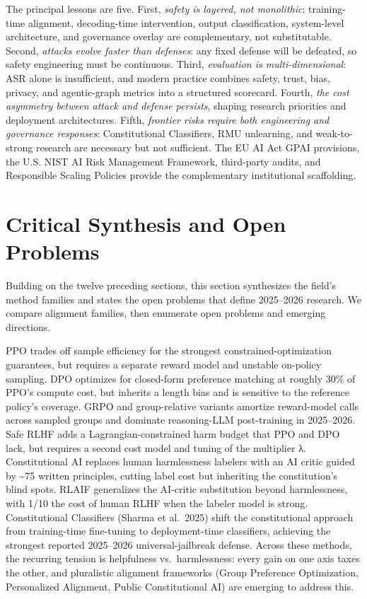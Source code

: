 \documentclass{article}
\begin{document}
The principal lessons are five. First, \emph{safety is layered, not monolithic}: training-time alignment, decoding-time intervention, output classification, system-level architecture, and governance overlay are complementary, not substitutable. Second, \emph{attacks evolve faster than defenses}: any fixed defense will be defeated, so safety engineering must be continuous. Third, \emph{evaluation is multi-dimensional}: ASR alone is insufficient, and modern practice combines safety, trust, bias, privacy, and agentic-graph metrics into a structured scorecard. Fourth, \emph{the cost asymmetry between attack and defense persists}, shaping research priorities and deployment architectures. Fifth, \emph{frontier risks require both engineering and governance responses}: Constitutional Classifiers, RMU unlearning, and weak-to-strong research are necessary but not sufficient. The EU AI Act GPAI provisions, the U.S. NIST AI Risk Management Framework, third-party audits, and Responsible Scaling Policies provide the complementary institutional scaffolding.

\section{Critical Synthesis and Open Problems}\label{critical-synthesis-and-open-problems}

Building on the twelve preceding sections, this section synthesizes the field's method families and states the open problems that define 2025--2026 research. We compare alignment families, then enumerate open problems and emerging directions.

PPO trades off sample efficiency for the strongest constrained-optimization guarantees, but requires a separate reward model and unstable on-policy sampling. DPO optimizes for closed-form preference matching at roughly 30\% of PPO's compute cost, but inherits a length bias and is sensitive to the reference policy's coverage. GRPO and group-relative variants amortize reward-model calls across sampled groups and dominate reasoning-LLM post-training in 2025--2026. Safe RLHF adds a Lagrangian-constrained harm budget that PPO and DPO lack, but requires a second cost model and tuning of the multiplier λ. Constitutional AI replaces human harmlessness labelers with an AI critic guided by \textasciitilde75 written principles, cutting label cost but inheriting the constitution's blind spots. RLAIF generalizes the AI-critic substitution beyond harmlessness, with 1/10 the cost of human RLHF when the labeler model is strong. Constitutional Classifiers (Sharma et al.~2025) shift the constitutional approach from training-time fine-tuning to deployment-time classifiers, achieving the strongest reported 2025--2026 universal-jailbreak defense. Across these methods, the recurring tension is helpfulness vs.~harmlessness: every gain on one axis taxes the other, and pluralistic alignment frameworks (Group Preference Optimization, Personalized Alignment, Public Constitutional AI) are emerging to address this.
\end{document}
